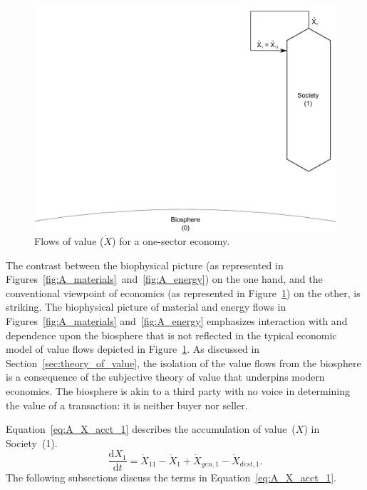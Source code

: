 \begin{landscape}
\begin{figure}[!ht]
\centering
\includegraphics[width=0.8\linewidth]{Part_2/Chapter_Values/images/1_sector_value.pdf}
\caption[Flows of value for a one-sector economy]{Flows of value ($\dot{X}$) for a one-sector economy.}
\label{fig:A_value} 
\end{figure}
\end{landscape}

The contrast between the biophysical picture
(as represented in Figures~\ref{fig:A_materials}~and~\ref{fig:A_energy})
on the one hand, 
and the conventional viewpoint of economics
(as represented in Figure~\ref{fig:A_value}) 
on the other, is striking.  
The biophysical picture of material and energy flows in 
Figures~\ref{fig:A_materials} and~\ref{fig:A_energy} 
emphasizes interaction with and dependence upon the biosphere 
that is not reflected in the typical economic model of 
value flows depicted in Figure~\ref{fig:A_value}.
As discussed in Section~\ref{sec:theory_of_value},
the isolation of the value flows from the biosphere is a consequence
of the subjective theory of value
that underpins modern economics.
The biosphere is akin to a third party with no voice 
in determining the value of a transaction:
it is neither buyer nor seller. 

Equation~\ref{eq:A_X_acct_1} describes the accumulation 
of value~($X$) in Society~(1).
%
\begin{equation} \label{eq:A_X_acct_1}
	\frac{\mathrm{d}X_{1}}{\mathrm{d}t} 
	= \dot{X}_{11} 
	- \dot{X}_{1}
	+ \dot{X}_{gen,1}
	- \dot{X}_{dest,1}.
\end{equation}
%
The following subsections discuss the terms in Equation~\ref{eq:A_X_acct_1}.


